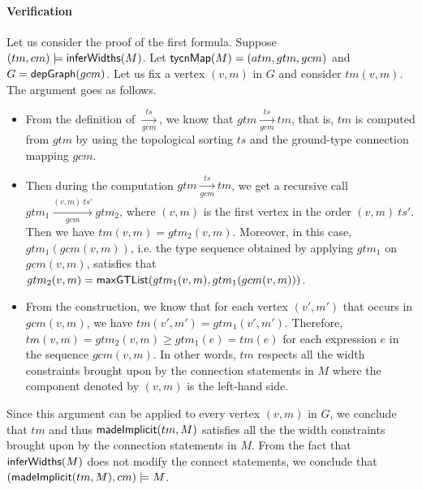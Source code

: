 \paragraph*{Verification}
Let us consider the proof of the first formula.
Suppose $(tm, cm) \models {\sf inferWidths}(M)$. Let ${\sf tycnMap}(M)= (atm, gtm, gcm)$ and $G = {\sf depGraph}(gcm)$. 
Let us fix a vertex $(v, m)$ in $G$ and consider $tm(v, m)$. 
The argument goes as follows. 
\begin{itemize}
\item From the definition of $\xrightarrow[gcm]{ts}$, we know that $gtm \xrightarrow[gcm]{ts} tm$, that is, $tm$ is computed from $gtm$ by using the topological sorting $ts$ and the ground-type connection mapping $gcm$. 
%
\item Then during the computation $gtm \xrightarrow[gcm]{ts} tm$, we get a recursive call $gtm_1 \xrightarrow[gcm]{(v,m)\ ts'} gtm_2$, where $(v,m)$ is the first vertex in the order $(v,m)\ ts'$. Then we have $tm(v,m) = gtm_2(v, m)$. Moreover, in this case, $gtm_1(gcm(v, m))$, i.e. the type sequence obtained by applying $gtm_1$ on $gcm(v, m)$, satisfies that $gtm_2(v, m) = {\sf maxGTList}(gtm_1(v, m), gtm_1(gcm(v, m)))$. 
%
\item From the construction, we know that for each vertex $(v', m')$ that occurs in $gcm(v, m)$, we have $tm(v', m') = gtm_1(v', m')$. Therefore, $tm(v, m) = gtm_2(v, m) \ge gtm_1(e) = tm(e)$ for each expression $e$ in the sequence $gcm(v, m)$. In other words, $tm$ respects all the width constraints brought upon by the connection statements in $M$ where the component denoted by $(v, m)$ is the left-hand side. 
%
\end{itemize}
Since this argument can be applied to every vertex $(v, m)$ in $G$, we conclude that $tm$ and thus ${\sf madeImplicit}(tm, M)$ satisfies all the the width constraints brought upon by the connection statements in $M$. From the fact that ${\sf inferWidths}(M)$ does not modify the connect statements, we conclude that $({\sf madeImplicit}(tm, M), cm) \models M$. 


